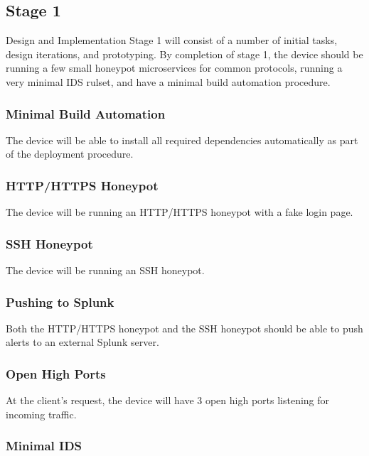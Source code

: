 \subsection{Stage 1}

Design and Implementation Stage 1 will consist of a number of initial tasks,
design iterations, and prototyping. By completion of stage 1, the device
should be running a few small honeypot microservices for common protocols,
running a very minimal IDS rulset, and have a minimal build automation
procedure.

\subsubsection{Minimal Build Automation}

The device will be able to install all required dependencies automatically
as part of the deployment procedure.

\subsubsection{HTTP/HTTPS Honeypot}

The device will be running an HTTP/HTTPS honeypot with a fake login page.

\subsubsection{SSH Honeypot}

The device will be running an SSH honeypot.

\subsubsection{Pushing to Splunk}

Both the HTTP/HTTPS honeypot and the SSH honeypot should be able to push
alerts to an external Splunk server.

\subsubsection{Open High Ports}

At the client's request, the device will have 3 open high ports listening
for incoming traffic.

\subsubsection{Minimal IDS}


